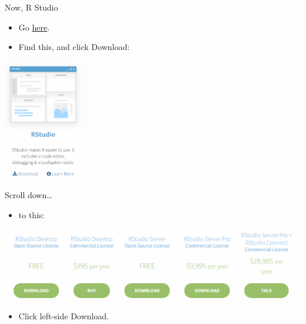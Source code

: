 \documentclass[ignorenonframetext,]{beamer}
\providecommand{\tightlist}{%
  \setlength{\itemsep}{0pt}\setlength{\parskip}{0pt}}
\begin{document}
\begin{frame}{Now, R Studio}
\protect\hypertarget{now-r-studio}{}

\begin{itemize}
\tightlist
\item
  Go \href{https://www.rstudio.com/}{here}.
\item
  Find this, and click Download:
\end{itemize}

\includegraphics[width=\textwidth,height=2.08333in]{rst1.png}

\end{frame}

\begin{frame}{Scroll down\ldots{}}
\protect\hypertarget{scroll-down}{}

\begin{itemize}
\tightlist
\item
  to this:
\end{itemize}

\includegraphics{rstlic.png}

\begin{itemize}
\tightlist
\item
  Click left-side Download.
\end{itemize}

\end{frame}
\end{document}
